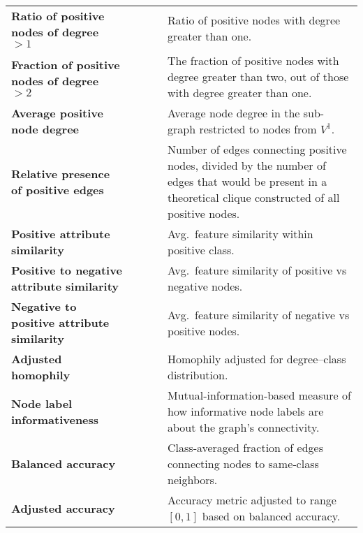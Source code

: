 \begin{table*}[h]
\begin{tabularx}{\linewidth}{XcccX}
		\textbf{Ratio of positive nodes of degree $>1$}    & \checkmark    & \checkmark         & \crossmark          & Ratio of positive nodes with degree greater than one. \\
		\textbf{Fraction of positive nodes of degree $>2$} & \checkmark    & \checkmark         & \crossmark          & The fraction of positive nodes with degree greater than two, out of those with degree greater than one. \\
		\textbf{Average positive node degree}              & \checkmark    & \checkmark         & \crossmark          & Average node degree in the sub-graph restricted to nodes from $V^1$. \\
		\textbf{Relative presence of positive edges}       & \checkmark    & \checkmark         & \crossmark          & Number of edges connecting positive nodes, divided by the number of edges that would be present in a theoretical clique constructed of all positive nodes. \\
		\textbf{Positive attribute similarity}             & \checkmark    & \crossmark         & \checkmark          & Avg.\ feature similarity within positive class. \\
		\textbf{Positive to negative attribute similarity} & \checkmark    & \crossmark         & \checkmark          & Avg.\ feature similarity of positive vs negative nodes. \\
		\textbf{Negative to positive attribute similarity} & \checkmark    & \crossmark         & \checkmark          & Avg.\ feature similarity of negative vs positive nodes. \\
		\textbf{Adjusted homophily}                        & \checkmark    & \checkmark         & \crossmark          & Homophily adjusted for degree–class distribution. \\
		\textbf{Node label informativeness}                & \checkmark    & \checkmark         & \crossmark          & Mutual‐information‐based measure of how informative node labels are about the graph’s connectivity. \\
		\textbf{Balanced accuracy}                         & \checkmark    & \checkmark         & \crossmark          & Class‐averaged fraction of edges connecting nodes to same‐class neighbors. \\
		\textbf{Adjusted accuracy}                         & \checkmark    & \checkmark         & \crossmark          & Accuracy metric adjusted to range $[0,1]$ based on balanced accuracy. \\
		\bottomrule
	\end{tabularx}
\end{table*}
